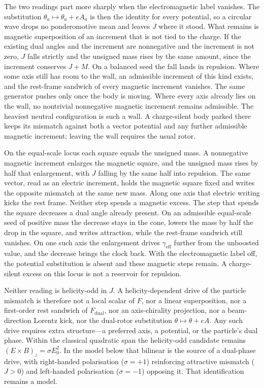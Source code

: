\documentclass[a4paper]{article}
\begin{document}
The two readings part more sharply when the electromagnetic label vanishes. The substitution $\theta_a\mapsto\theta_a+e A_a$ is then the identity for every potential, so a circular wave drops no ponderomotive mean and leaves $J$ where it stood. What remains is magnetic superposition of an increment that is not tied to the charge. If the existing dual angles and the increment are nonnegative and the increment is not zero, $J$ falls strictly and the unsigned mass rises by the same amount, since the increment conserves $J+M$. On a balanced seed the fall lands in repulsion. Where some axis still has room to the wall, an admissible increment of this kind exists, and the rest-frame sandwich of every magnetic increment vanishes. The same generator pushes only once the body is moving. Where every axis already lies on the wall, no nontrivial nonnegative magnetic increment remains admissible. The heaviest neutral configuration is such a wall. A charge-silent body parked there keeps its mismatch against both a vector potential and any further admissible magnetic increment; leaving the wall requires the usual rotor.

On the equal-scale locus each square equals the unsigned mass. A nonnegative magnetic increment enlarges the magnetic square, and the unsigned mass rises by half that enlargement, with \(J\) falling by the same half into repulsion. The same vector, read as an electric increment, holds the magnetic square fixed and writes the opposite mismatch at the same new mass. Along one axis that electric writing kicks the rest frame. Neither step spends a magnetic excess. The step that spends the square decreases a dual angle already present. On an admissible equal-scale seed of positive mass the decrease stays in the cone, lowers the mass by half the drop in the square, and writes attraction, while the rest-frame sandwich still vanishes. On one such axis the enlargement drives \(\gamma_{\mathrm{eff}}\) further from the unboosted value, and the decrease brings the clock back. With the electromagnetic label off, the potential substitution is absent and these magnetic steps remain. A charge-silent excess on this locus is not a reservoir for repulsion.

Neither reading is helicity-odd in $J$. A helicity-dependent drive of the particle mismatch is therefore not a local scalar of $F$, nor a linear superposition, nor a first-order rest sandwich of $F_{\mathrm{dual}}$, nor an axis-chirality projection, nor a beam-direction Lorentz kick, nor the dual-rotor substitution $\theta\mapsto\theta+eA$. Any such drive requires extra structure---a preferred axis, a potential, or the particle's dual phase. Within the classical quadratic span the helicity-odd candidate remains $(E\times B)_z=\sigma E_0^2$. In the model below that bilinear is the source of a dual-phase drive, with right-handed polarisation ($\sigma=+1$) reinforcing attractive mismatch ($J>0$) and left-handed polarisation ($\sigma=-1$) opposing it. That identification remains a model.
\end{document}
